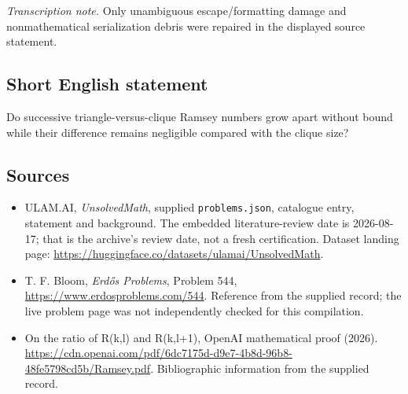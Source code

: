 \documentclass[11pt,a4paper]{article}
\begin{document}
{\small\emph{Transcription note.} Only unambiguous escape/formatting damage and nonmathematical serialization debris were repaired in the displayed source statement.}

\subsection{Short English statement}

Do successive triangle-versus-clique Ramsey numbers grow apart without bound while their difference remains negligible compared with the clique size?

\subsection{Sources}

{\small

\begin{itemize}

\item[\hypertarget{source:statement:1}{S1}] ULAM.AI, \emph{UnsolvedMath}, supplied \texttt{problems.json}, catalogue entry, statement and background. The embedded literature-review date is 2026-08-17; that is the archive’s review date, not a fresh certification. Dataset landing page: \url{https://huggingface.co/datasets/ulamai/UnsolvedMath}.

\item[\hypertarget{source:statement:2}{S2}] T. F. Bloom, \emph{Erdős Problems}, Problem 544, \url{https://www.erdosproblems.com/544}. Reference from the supplied record; the live problem page was not independently checked for this compilation.

\item[\hypertarget{source:statement:3}{S3}] On the ratio of R(k,l) and R(k,l+1), OpenAI mathematical proof (2026). \url{https://cdn.openai.com/pdf/6dc7175d-d9e7-4b8d-96b8-48fe5798cd5b/Ramsey.pdf}. Bibliographic information from the supplied record.

\end{itemize}

}

\label{end:statement}
\end{document}
